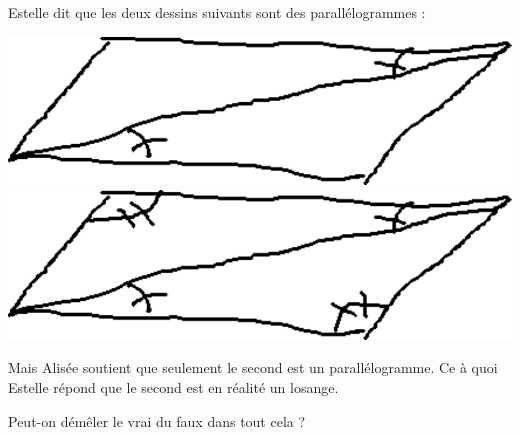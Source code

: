 
\begin{exercice}\label{exo2smath-0178}

    Estelle dit que les deux dessins suivants sont des parallélogrammes :
    \begin{center}
    \includegraphics[width=\linewidth]{codage_parall1.pdf}
    \includegraphics[width=\linewidth]{codage_parall2.pdf}
    \end{center}
    Mais Alisée soutient que seulement le second est un parallélogramme. Ce à quoi Estelle répond que le second est en réalité un losange.

    Peut-on démêler le vrai du faux dans tout cela ?

\end{exercice}
